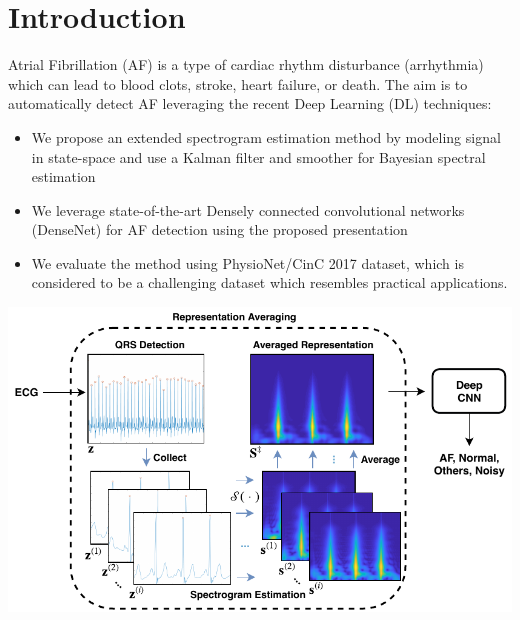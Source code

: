\documentclass[portrait,a0,final]{a0poster} %
\begin{document}

\vspace{0.04\linewidth}

\centering



\small %


\begin{minipage}{0.98\linewidth}




\begin{minipage}[t]{0.47\linewidth}
\setlength{\parindent}{10mm} %


\section{Introduction}
\Large
Atrial Fibrillation (AF) is a type of cardiac rhythm disturbance (arrhythmia) which can lead to blood clots, stroke, heart failure, or death. The aim is to automatically detect AF leveraging the recent Deep Learning (DL) techniques:
\vspace{10mm}
\begin{itemize}
	\item We propose an extended spectrogram estimation method by modeling signal in state-space and use a Kalman filter and smoother for Bayesian spectral estimation
	\item We leverage state-of-the-art Densely connected convolutional networks (DenseNet) \cite{huang2017densely} for AF detection using the proposed presentation
	\item We evaluate the method using PhysioNet/CinC 2017 dataset, which is considered to be a challenging dataset which resembles practical applications.
\end{itemize}
\begin{minipage}[c]{\linewidth}
	\centering
	\includegraphics[scale=2]{figures/pre-processing}
\end{minipage}



\end{minipage}
\end{minipage}
\end{document}
